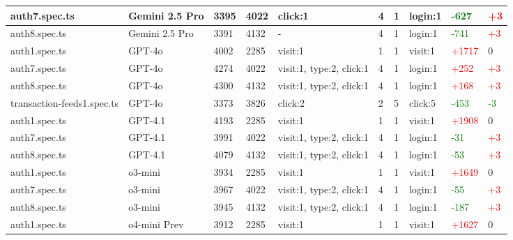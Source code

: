 \documentclass{article}
\begin{document}
\begin{landscape}
\begin{longtable}{|p{2.5cm}|p{1.5cm}|p{1cm}|p{1cm}|p{2cm}|p{1cm}|p{1cm}|p{2cm}|p{1.5cm}|p{1.5cm}|}
auth7.spec.ts & Gemini 2.5 Pro & 3395 & 4022 & click:1 & 4 & 1 & login:1 & \textcolor{green}{-627} & \textcolor{red}{+3} \\
\hline

auth8.spec.ts & Gemini 2.5 Pro & 3391 & 4132 & - & 4 & 1 & login:1 & \textcolor{green}{-741} & \textcolor{red}{+3} \\
\hline

auth1.spec.ts & GPT-4o & 4002 & 2285 & visit:1 & 1 & 1 & visit:1 & \textcolor{red}{+1717} & 0 \\
\hline

auth7.spec.ts & GPT-4o & 4274 & 4022 & visit:1, type:2, click:1 & 4 & 1 & login:1 & \textcolor{red}{+252} & \textcolor{red}{+3} \\
\hline

auth8.spec.ts & GPT-4o & 4300 & 4132 & visit:1, type:2, click:1 & 4 & 1 & login:1 & \textcolor{red}{+168} & \textcolor{red}{+3} \\
\hline

transaction-feeds1.spec.ts & GPT-4o & 3373 & 3826 & click:2 & 2 & 5 & click:5 & \textcolor{green}{-453} & \textcolor{green}{-3} \\
\hline

auth1.spec.ts & GPT-4.1 & 4193 & 2285 & visit:1 & 1 & 1 & visit:1 & \textcolor{red}{+1908} & 0 \\
\hline

auth7.spec.ts & GPT-4.1 & 3991 & 4022 & visit:1, type:2, click:1 & 4 & 1 & login:1 & \textcolor{green}{-31} & \textcolor{red}{+3} \\
\hline

auth8.spec.ts & GPT-4.1 & 4079 & 4132 & visit:1, type:2, click:1 & 4 & 1 & login:1 & \textcolor{green}{-53} & \textcolor{red}{+3} \\
\hline

auth1.spec.ts & o3-mini & 3934 & 2285 & visit:1 & 1 & 1 & visit:1 & \textcolor{red}{+1649} & 0 \\
\hline

auth7.spec.ts & o3-mini & 3967 & 4022 & visit:1, type:2, click:1 & 4 & 1 & login:1 & \textcolor{green}{-55} & \textcolor{red}{+3} \\
\hline

auth8.spec.ts & o3-mini & 3945 & 4132 & visit:1, type:2, click:1 & 4 & 1 & login:1 & \textcolor{green}{-187} & \textcolor{red}{+3} \\
\hline

auth1.spec.ts & o4-mini Prev & 3912 & 2285 & visit:1 & 1 & 1 & visit:1 & \textcolor{red}{+1627} & 0 \\
\hline


\end{longtable}
\end{landscape}
\end{document}
